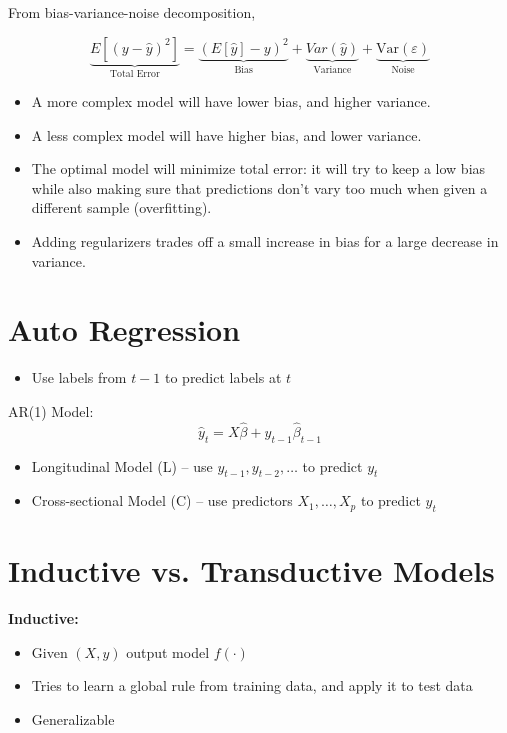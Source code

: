 \documentclass{article}
\begin{document}
From bias-variance-noise decomposition,

\[
    \underbrace{E[(y - \hat{y})^2]}_{\text{Total Error}} = \underbrace{(E[\hat{y}] - y)^2}_{\text{Bias}} + \underbrace{Var(\hat{y})}_{\text{Variance}} + \underbrace{\text{Var}(\varepsilon)}_{\text{Noise}}
\]

\begin{itemize}
    \item A more complex model will have lower bias, and higher variance.
    \item A less complex model will have higher bias, and lower variance.
    \item The optimal model will minimize total error: it will try to keep a low bias while also making sure that predictions don't vary too much when given a different sample (overfitting).
    \item Adding regularizers trades off a small increase in bias for a large decrease in variance.
\end{itemize}

\section*{Auto Regression}

\begin{itemize}
    \item Use labels from $t-1$ to predict labels at $t$
\end{itemize}

AR(1) Model:
\[
\hat{y}_t = X\hat{\beta} + y_{t-1}\hat{\beta}_{t-1}
\]

\begin{itemize}
    \item Longitudinal Model (L) -- use $y_{t-1}, y_{t-2}, \ldots$ to predict $y_t$
    \item Cross-sectional Model (C) -- use predictors $X_1, \ldots, X_p$ to predict $y_t$
\end{itemize}

\section*{Inductive vs. Transductive Models}

\textbf{Inductive:}
\begin{itemize}
    \item Given $(X, y)$ output model $f(\cdot)$
    \item Tries to learn a global rule from training data, and apply it to test data
    \item Generalizable
\end{itemize}
\end{document}
